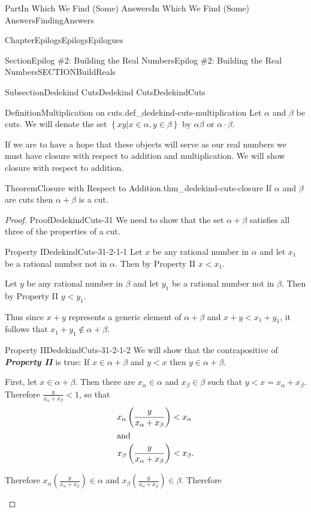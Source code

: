 \documentclass[oneside,10pt,]{book}
\newcommand{\alert}[1]{\textbf{\textit{#1}}}
\numberwithin{equation}{part}
\newcommand{\lt}{<}
\newcommand{\amp}{&}
\begin{document}
\begin{partptx}{Part}{In Which We Find (Some) Answers}{}{In Which We Find (Some) Answers}{}{}{FindingAnswers}
\begin{chapterptx}{Chapter}{Epilogs}{}{Epilogs}{}{}{Epilogues}
\begin{sectionptx}{Section}{Epilog \#2: Building the Real Numbers}{}{Epilog \#2: Building the Real Numbers}{}{}{SECTIONBuildReals}
\begin{subsectionptx}{Subsection}{Dedekind Cuts}{}{Dedekind Cuts}{}{}{DedekindCuts}
\begin{definition}{Definition}{Multiplication on cuts.}{def_dedekind-cuts-multiplication}
%
Let \(\alpha\) and \(\beta\) be cuts.  We will denote the set \(\left\{xy|x\in\alpha,
y\in\beta\right\}\) by \(\alpha\beta \text{ or }
\alpha\cdot\beta\).%
\end{definition}
If we are to have a hope that these objects will serve as our real numbers we must have closure with respect to addition and multiplication.  We will show closure with respect to addition.%
\begin{theorem}{Theorem}{Closure with Respect to Addition.}{}{thm_dedekind-cuts-closure}%
%
If \(\alpha\) and \(\beta\) are cuts then \(\alpha+\beta\) is a cut.%
\end{theorem}
\begin{proof}{Proof}{}{DedekindCuts-31}
We need to show that the set \(\alpha+\beta\) satisfies all three of the properties of a cut.%
\par
%
\begin{descriptionlist}
\begin{dlimedium}{Property I}{DedekindCuts-31-2-1-1}%
Let \(x\) be any rational number in \(\alpha\) and let \(x_1\) be a rational number not in \(\alpha\).  Then by Property II \(x\lt
x_1\).%
\par
Let \(y\) be any rational number in \(\beta\) and let \(y_1\) be a rational number not in \(\beta\).  Then by Property II \(y\lt
y_1\).%
\par
Thus since \(x+y\) represents a generic element of \(\alpha+\beta\) and \(x+y\lt x_1+y_1\), it follows that \(x_1+y_1\not\in\alpha+\beta\).%
\end{dlimedium}%
\begin{dlimedium}{Property II}{DedekindCuts-31-2-1-2}%
We will show that the contrapositive of \alert{Property II} is true: If \(x\in\alpha+\beta\) and \(y\lt x\) then \(y\in\alpha+\beta\).%
\par
First, let \(x\in\alpha+\beta\).  Then there are \(x_\alpha\in\alpha\) and \(x_\beta\in\beta\) such that \(y\lt x=x_\alpha+x_\beta\).  Therefore \(\frac{y}{x_\alpha+x_\beta}\lt 1\), so that%
\begin{align*}
x_\alpha\left(\frac{y}{x_\alpha+x_\beta}\right)\amp \lt  x_\alpha\\
\intertext{and}
x_\beta\left(\frac{y}{x_\alpha+x_\beta}\right)\amp \lt  x_\beta\text{.}
\end{align*}
%
\par
Therefore \(x_\alpha\left(\frac{y}{x_\alpha+x_\beta}\right)\in\alpha\) and \(x_\beta\left(\frac{y}{x_\alpha+x_\beta}\right)\in\beta\). Therefore%

\end{dlimedium}
\end{descriptionlist}
\end{proof}
\end{subsectionptx}
\end{sectionptx}
\end{chapterptx}
\end{partptx}
\end{document}
